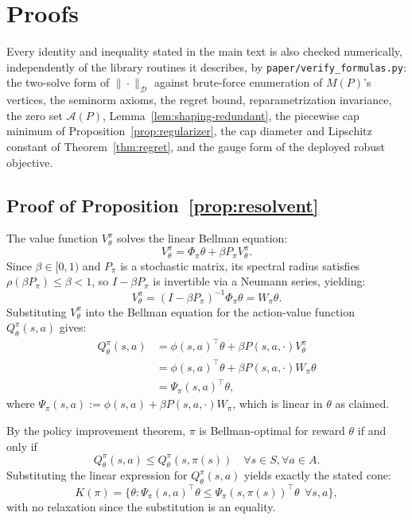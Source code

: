 \documentclass{article}
\newcommand{\Dnorm}[1]{\|#1\|_{\mathcal D}}
\begin{document}
\section{Proofs}
\label{app:proofs}

Every identity and inequality stated in the main text is also checked
numerically, independently of the library routines it describes, by
\texttt{paper/verify\_formulas.py}: the two-solve form of $\Dnorm{\cdot}$
against brute-force enumeration of $M(P)$'s vertices, the seminorm axioms, the
regret bound, reparametrization invariance, the zero set $\mathcal A(P)$,
Lemma~\ref{lem:shaping-redundant}, the piecewise cap minimum of
Proposition~\ref{prop:regularizer}, the cap diameter and Lipschitz constant of
Theorem~\ref{thm:regret}, and the gauge form of the deployed robust objective.

\subsection{Proof of Proposition~\ref{prop:resolvent}}
\label{app:proof-resolvent}

The value function $V^\pi_\theta$ solves the linear Bellman equation:
\[
V^\pi_\theta = \Phi_\pi\theta + \beta P_\pi V^\pi_\theta.
\]
Since $\beta\in[0,1)$ and $P_\pi$ is a stochastic matrix, its spectral radius satisfies $\rho(\beta P_\pi)\le\beta<1$, so $I-\beta P_\pi$ is invertible via a Neumann series, yielding:
\[
V^\pi_\theta = (I-\beta P_\pi)^{-1}\Phi_\pi\theta = W_\pi\theta.
\]
Substituting $V^\pi_\theta$ into the Bellman equation for the action-value function $Q^\pi_\theta(s,a)$ gives:
\begin{align*}
Q^\pi_\theta(s,a) &= \phi(s,a)^\top\theta + \beta P(s,a,\cdot) V^\pi_\theta \\
&= \phi(s,a)^\top\theta + \beta P(s,a,\cdot) W_\pi\theta \\
&= \Psi_\pi(s,a)^\top\theta,
\end{align*}
where $\Psi_\pi(s,a) := \phi(s,a) + \beta P(s,a,\cdot) W_\pi$, which is linear in $\theta$ as claimed.

By the policy improvement theorem, $\pi$ is Bellman-optimal for reward $\theta$ if and only if
\[
Q^\pi_\theta(s,a) \leq Q^\pi_\theta(s,\pi(s)) \quad \forall s \in S, \forall a \in A.
\]
Substituting the linear expression for $Q^\pi_\theta(s,a)$ yields exactly the stated cone:
\[
K(\pi) = \{\theta : \Psi_\pi(s,a)^\top\theta \leq \Psi_\pi(s,\pi(s))^\top\theta\ \ \forall s,a\},
\]
with no relaxation since the substitution is an equality.
\end{document}

